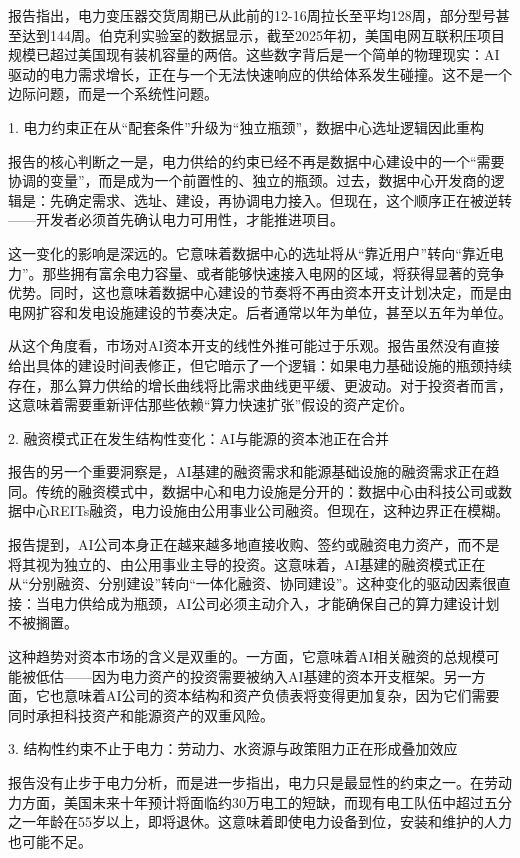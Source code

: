 \documentclass[11pt]{ctexart}
\begin{document}
报告指出，电力变压器交货周期已从此前的12-16周拉长至平均128周，部分型号甚至达到144周。伯克利实验室的数据显示，截至2025年初，美国电网互联积压项目规模已超过美国现有装机容量的两倍。这些数字背后是一个简单的物理现实：AI驱动的电力需求增长，正在与一个无法快速响应的供给体系发生碰撞。这不是一个边际问题，而是一个系统性问题。

1. 电力约束正在从“配套条件”升级为“独立瓶颈”，数据中心选址逻辑因此重构

报告的核心判断之一是，电力供给的约束已经不再是数据中心建设中的一个“需要协调的变量”，而是成为一个前置性的、独立的瓶颈。过去，数据中心开发商的逻辑是：先确定需求、选址、建设，再协调电力接入。但现在，这个顺序正在被逆转——开发者必须首先确认电力可用性，才能推进项目。

这一变化的影响是深远的。它意味着数据中心的选址将从“靠近用户”转向“靠近电力”。那些拥有富余电力容量、或者能够快速接入电网的区域，将获得显著的竞争优势。同时，这也意味着数据中心建设的节奏将不再由资本开支计划决定，而是由电网扩容和发电设施建设的节奏决定。后者通常以年为单位，甚至以五年为单位。

从这个角度看，市场对AI资本开支的线性外推可能过于乐观。报告虽然没有直接给出具体的建设时间表修正，但它暗示了一个逻辑：如果电力基础设施的瓶颈持续存在，那么算力供给的增长曲线将比需求曲线更平缓、更波动。对于投资者而言，这意味着需要重新评估那些依赖“算力快速扩张”假设的资产定价。

2. 融资模式正在发生结构性变化：AI与能源的资本池正在合并

报告的另一个重要洞察是，AI基建的融资需求和能源基础设施的融资需求正在趋同。传统的融资模式中，数据中心和电力设施是分开的：数据中心由科技公司或数据中心REITs融资，电力设施由公用事业公司融资。但现在，这种边界正在模糊。

报告提到，AI公司本身正在越来越多地直接收购、签约或融资电力资产，而不是将其视为独立的、由公用事业主导的投资。这意味着，AI基建的融资模式正在从“分别融资、分别建设”转向“一体化融资、协同建设”。这种变化的驱动因素很直接：当电力供给成为瓶颈，AI公司必须主动介入，才能确保自己的算力建设计划不被搁置。

这种趋势对资本市场的含义是双重的。一方面，它意味着AI相关融资的总规模可能被低估——因为电力资产的投资需要被纳入AI基建的资本开支框架。另一方面，它也意味着AI公司的资本结构和资产负债表将变得更加复杂，因为它们需要同时承担科技资产和能源资产的双重风险。

3. 结构性约束不止于电力：劳动力、水资源与政策阻力正在形成叠加效应

报告没有止步于电力分析，而是进一步指出，电力只是最显性的约束之一。在劳动力方面，美国未来十年预计将面临约30万电工的短缺，而现有电工队伍中超过五分之一年龄在55岁以上，即将退休。这意味着即使电力设备到位，安装和维护的人力也可能不足。
\end{document}
